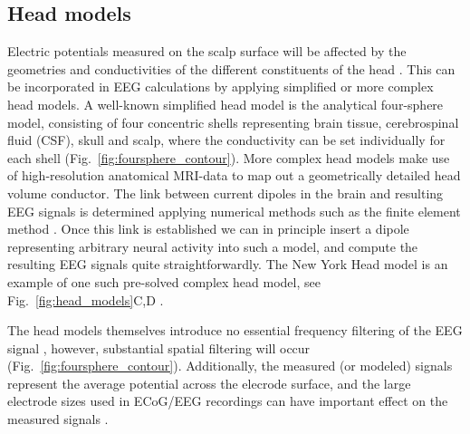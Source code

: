\documentclass[preprint,11pt,authoryear]{elsarticle}
\newcommand{\hlj}[2][OliveGreen]{ {\sethlcolor{#1} \hl{#2}} }
\newcommand{\hlp}[2][Purple]{ {\sethlcolor{#1} \hl{#2}} }
\newcommand{\tvnnote}[1]{\color{white}{\hlj{TVN: #1 }}\color{black}}
\newcommand{\snnote}[1]{\color{white}{\hlp{SN: #1 }}\color{black}}
\begin{document}
\begin{itemize}
\begin{itemize}
\subsection{Head models}
Electric potentials measured on the scalp surface will be affected by the geometries and conductivities of the different constituents of the head \citep{Nunez2006}. This can be incorporated in EEG calculations by applying simplified or more complex head models.
A well-known simplified head model is the analytical four-sphere model, consisting of four concentric shells representing brain tissue, cerebrospinal fluid (CSF), skull and scalp, where the conductivity can be set individually for each shell \citep{Naess2017, Srinivasan1998, Nunez2006} (Fig.~\ref{fig:foursphere_contour}).
More complex head models make use of high-resolution anatomical MRI-data to map out a geometrically detailed head volume conductor. The link between current dipoles in the brain and resulting EEG signals is determined applying numerical methods such as the finite element method \citep{Larson2013, Logg2012}. Once this link is established we can in principle insert a dipole representing arbitrary neural activity into such a model, and compute the resulting EEG signals quite straightforwardly. The New York Head model is an example of one such pre-solved complex head model, see Fig.~\ref{fig:head_models}C,D \citep{Huang2016}.

The head models themselves introduce no essential frequency filtering of the EEG signal \citep{Pfurtscheller1975, Nunez2006, Ranta2017}, however, substantial spatial filtering will occur (Fig.~\ref{fig:foursphere_contour}). Additionally, the measured (or modeled) signals represent the average potential across the elecrode surface, and the large electrode sizes used in ECoG/EEG recordings can have important effect on the measured signals \citep{Nunez2006, Hagen2018, Dubey2019}.
%
%


\end{itemize}
\end{itemize}
\end{document}
